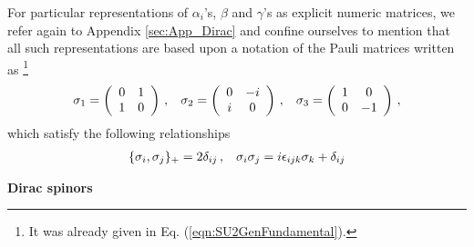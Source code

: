 For particular representations of  $\alpha_i$'s, $\beta$ and $\gamma$'s as
explicit numeric matrices, we refer again to Appendix \ref{sec:App_Dirac}
and confine ourselves to mention that all such representations are based upon
a notation of the Pauli matrices written as
\footnote{%
It was already given in Eq. (\ref{eqn:SU2GenFundamental}).
}%
\begin{eqnarray}
\sigma_1 =
\left(
\begin{array}{cc}
0 & 1 \\ 1 & 0
\end{array}
\right)\,,
\hspace{3mm}
\sigma_2 =
\left(
\begin{array}{cc}
0 & -i \\ i & 0
\end{array}
\right)\,,
\hspace{3mm}
\sigma_3 =
\left(
\begin{array}{cc}
1 &  0\\ 0 & -1
\end{array}
\right)\,,
\end{eqnarray}
which satisfy the following relationships
\begin{eqnarray}
\{
\sigma_i, \sigma_j \}_+ = 2 \delta_{ij}\,,
\hspace{3mm}
\sigma_i \sigma_j = i\epsilon_{ijk} \sigma_k + \delta_{ij}
\end{eqnarray}

\bigskip
\noindent
{\bf Dirac spinors}

